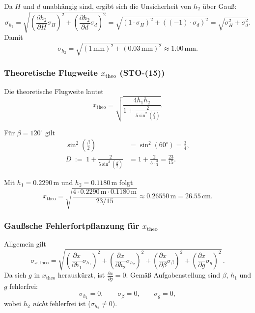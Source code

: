 \documentclass{article}
\begin{document}
Da \(H\) und \(d\) unabhängig sind, ergibt sich die Unsicherheit von \(h_2\) über Gauß:
\begin{equation}
\sigma_{h_2} =
\sqrt{\left(\frac{\partial h_2}{\partial H}\sigma_H\right)^2
     +\left(\frac{\partial h_2}{\partial d}\sigma_d\right)^2}
=
\sqrt{(1\cdot\sigma_H)^2 + ((-1)\cdot\sigma_d)^2}
=
\sqrt{\sigma_H^2+\sigma_d^2}.
\end{equation}
Damit
\begin{equation}
\sigma_{h_2}=\sqrt{(1\,\mathrm{mm})^2+(0.03\,\mathrm{mm})^2}
\approx 1.00\,\mathrm{mm}.
\end{equation}

\subsubsection*{Theoretische Flugweite \(x_{\mathrm{theo}}\) (STO-(15))}
Die theoretische Flugweite lautet
\begin{equation}
x_{\mathrm{theo}}
=\sqrt{\frac{4h_1h_2}{1+\frac{2}{5\sin^2\!\left(\frac{\beta}{2}\right)}}}.
\end{equation}

Für \(\beta=120^\circ\) gilt
\begin{align}
\sin^{2}\!\left(\frac{\beta}{2}\right)
&=\sin^{2}(60^\circ)=\frac{3}{4},\\[4pt]
D \;:=\; 1+\frac{2}{5\sin^{2}\!\left(\frac{\beta}{2}\right)}
&=1+\frac{2}{5\cdot\frac{3}{4}}
=\frac{23}{15}.
\end{align}

Mit \(h_1=0.2290\,\mathrm{m}\) und \(h_2=0.1180\,\mathrm{m}\) folgt
\begin{equation}
x_{\mathrm{theo}}
=\sqrt{\frac{4\cdot 0.2290\,\mathrm{m}\cdot 0.1180\,\mathrm{m}}{23/15}}
\approx 0.26550\,\mathrm{m}
= 26.55\,\mathrm{cm}.
\end{equation}

\subsubsection*{Gaußsche Fehlerfortpflanzung für \(x_{\mathrm{theo}}\)}
Allgemein gilt
\begin{equation}
\sigma_{x,\mathrm{theo}}
= \sqrt{\left(\frac{\partial x}{\partial h_1}\sigma_{h_1}\right)^2
      +\left(\frac{\partial x}{\partial h_2}\sigma_{h_2}\right)^2
      +\left(\frac{\partial x}{\partial \beta}\sigma_{\beta}\right)^2
      +\left(\frac{\partial x}{\partial g}\sigma_{g}\right)^2}\,.
\end{equation}
Da sich \(g\) in \(x_{\mathrm{theo}}\) herauskürzt, ist \(\frac{\partial x}{\partial g}=0\).
Gemäß Aufgabenstellung sind \(\beta\), \(h_1\) und \(g\) fehlerfrei:
\begin{equation}
\sigma_{h_1}=0,\qquad \sigma_{\beta}=0,\qquad \sigma_{g}=0,
\end{equation}
wobei \(h_2\) \emph{nicht} fehlerfrei ist (\(\sigma_{h_2}\neq 0\)).
\end{document}
